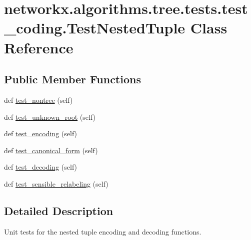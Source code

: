 \hypertarget{classnetworkx_1_1algorithms_1_1tree_1_1tests_1_1test__coding_1_1TestNestedTuple}{}\section{networkx.\+algorithms.\+tree.\+tests.\+test\+\_\+coding.\+Test\+Nested\+Tuple Class Reference}
\label{classnetworkx_1_1algorithms_1_1tree_1_1tests_1_1test__coding_1_1TestNestedTuple}
\subsection*{Public Member Functions}
\begin{DoxyCompactItemize}
\item 
def \hyperlink{classnetworkx_1_1algorithms_1_1tree_1_1tests_1_1test__coding_1_1TestNestedTuple_ac8c514b8ef183f6e0ba709d35bd38f93}{test\+\_\+nontree} (self)
\item 
def \hyperlink{classnetworkx_1_1algorithms_1_1tree_1_1tests_1_1test__coding_1_1TestNestedTuple_a2cf26c8122f1cb05af8693d7008aa93e}{test\+\_\+unknown\+\_\+root} (self)
\item 
def \hyperlink{classnetworkx_1_1algorithms_1_1tree_1_1tests_1_1test__coding_1_1TestNestedTuple_a04938d1747c459de07dd142cd88a00c6}{test\+\_\+encoding} (self)
\item 
def \hyperlink{classnetworkx_1_1algorithms_1_1tree_1_1tests_1_1test__coding_1_1TestNestedTuple_af7b266b705345c8d28edad04f54cecf2}{test\+\_\+canonical\+\_\+form} (self)
\item 
def \hyperlink{classnetworkx_1_1algorithms_1_1tree_1_1tests_1_1test__coding_1_1TestNestedTuple_aeffe34628cc742ac5a646a03a3e569b8}{test\+\_\+decoding} (self)
\item 
def \hyperlink{classnetworkx_1_1algorithms_1_1tree_1_1tests_1_1test__coding_1_1TestNestedTuple_a47ce28cbc6142ffc006c37e92e57f788}{test\+\_\+sensible\+\_\+relabeling} (self)
\end{DoxyCompactItemize}


\subsection{Detailed Description}
\begin{DoxyVerb}Unit tests for the nested tuple encoding and decoding functions.\end{DoxyVerb}
 

